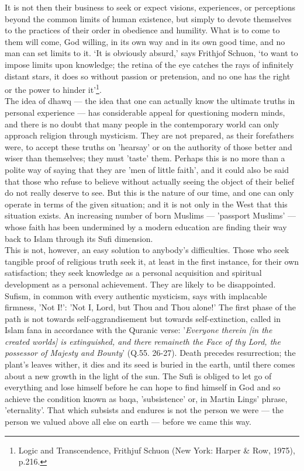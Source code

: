 \documentclass[10pt, twoside,openright]{book}
\begin{document}
It is not then their business to seek or expect visions, experiences, or perceptions beyond the 
common limits of human existence, but simply to devote themselves to the practices of their order in 
obedience and humility. What is to come to them will come, God willing, in its own way and in its own 
good time, and no man can set limits to it. `It is obviously absurd,' says Frithjof Schuon, `to want 
to impose limits upon knowledge; the retina of the eye catches the rays of infinitely distant stars, 
it does so without passion or pretension, and no one has the right or the power to hinder it'\footnote{Logic and Transcendence, Frithjuf Schuon (New York: Harper \& Row, 1975), p.216.}. \\

The idea of dhawq --- the idea that one can actually know the ultimate truths in personal experience --- 
has considerable appeal for questioning modern minds, and there is no doubt that many people in the 
contemporary world can only approach religion through mysticism. They are not prepared, as their 
forefathers were, to accept these truths on 'hearsay' or on the authority of those better and wiser 
than themselves; they must 'taste' them. Perhaps this is no more than a polite way of saying that 
they are 'men of little faith', and it could also be said that those who refuse to believe without 
actually seeing the object of their belief do not really deserve to see. But this is the nature of 
our time, and one can only operate in terms of the given situation; and it is not only in the West 
that this situation exists. An increasing number of born Muslims --- 'passport Muslims' --- whose faith 
has been undermined by a modern education are finding their way back to Islam through its Sufi 
dimension. \\

This is not, however, an easy solution to anybody's difficulties. Those who seek tangible proof of 
religious truth seek it, at least in the first instance, for their own satisfaction; they seek 
knowledge as a personal acquisition and spiritual development as a personal achievement. They are 
likely to be disappointed. Sufism, in common with every authentic mysticism, says with implacable 
firmness, 'Not I!': 'Not I, Lord, but Thou and Thou alone!' The first phase of the path is not 
towards self\hyp{}aggrandisement but towards self\hyp{}extinction, called in Islam fana in accordance with the 
Quranic verse: '\emph{Everyone therein [in the created worlds] is extinguished, and there remaineth the 
Face of thy Lord, the possessor of Majesty and Bounty}' (Q.55. 26-27). Death precedes resurrection; the 
plant's leaves wither, it dies and its seed is buried in the earth, until there comes about a new 
growth in the light of the sun. The Sufi is obliged to let go of everything and lose himself before 
he can hope to find himself in God and so achieve the condition known as baqa, 'subsistence' or, in 
Martin Lings' phrase, 'eternality'. That which subsists and endures is not the person we were --- the 
person we valued above all else on earth --- before we came this way. \\
\end{document}
